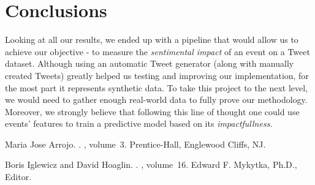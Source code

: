 \documentclass[11pt]{article}
\begin{document}
	\section{Conclusions}
	Looking at all our results, we ended up with a pipeline that would allow us to achieve our objective - to measure the \textit{sentimental impact} of an event on a Tweet dataset. Although using an automatic Tweet generator (along with manually created Tweets) greatly helped us testing and improving our implementation, for the most part it represents synthetic data. To take this project to the next level, we would need to gather enough real-world data to fully prove our methodology. Moreover, we strongly believe that following this line of thought one could use events' features to train a predictive model based on its \textit{impactfullness}.
	
	\newpage
	
	\begin{thebibliography}{}
		
		Maria Jose Arrojo.
		.
		, volume~3.
		\newblock Prentice-{Hall}, Englewood Cliffs, NJ.
		
		Boris Iglewicz and David Hoaglin.
		.
		, volume~16.
		\newblock Edward F. Mykytka, Ph.D., Editor.
	\end{thebibliography}
	
\end{document}
